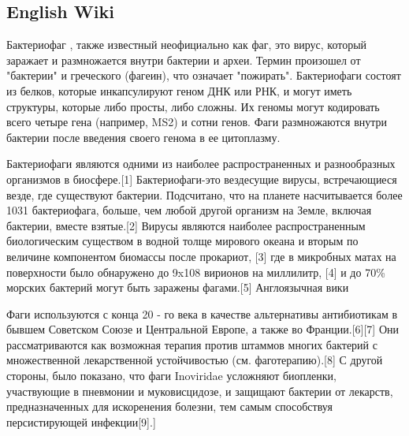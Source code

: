 \documentclass[a4paper,12pt]{article}
\begin{document}
    \begin{center}
    \item \subsection{English Wiki}
    \end{center}

	\par{Бактериофаг , также известный неофициально как фаг, это вирус, который
	заражает и размножается внутри бактерии и археи. Термин произошел от "бактерии" и греческого (фагеин), что
	означает "пожирать". Бактериофаги состоят из белков, которые инкапсулируют геном ДНК или РНК, и могут иметь
	структуры, которые либо просты, либо сложны. Их геномы могут кодировать всего четыре гена (например, MS2) и сотни
	генов. Фаги размножаются внутри бактерии после введения своего генома в ее цитоплазму.}
	
	\par{Бактериофаги являются одними из наиболее распространенных и разнообразных организмов в биосфере.[1]
	Бактериофаги-это вездесущие вирусы, встречающиеся везде, где существуют бактерии. Подсчитано, что на планете
	насчитывается более 1031 бактериофага, больше, чем любой другой организм на Земле, включая бактерии, вместе
	взятые.[2] Вирусы являются наиболее распространенным биологическим существом в водной толще мирового океана и вторым
	по величине компонентом биомассы после прокариот, [3] где в микробных матах на поверхности было обнаружено до 9x108
	вирионов на миллилитр, [4] и до 70\% морских бактерий могут быть заражены фагами.[5] Англоязычная вики}

    \par{Фаги используются с конца 20 - го века в качестве альтернативы антибиотикам в бывшем Советском Союзе и
    Центральной Европе, а также во Франции.[6][7] Они рассматриваются как возможная терапия против штаммов многих
    бактерий с множественной лекарственной устойчивостью (см. фаготерапию).[8] С другой стороны, было показано, что фаги
    Inoviridae усложняют биопленки, участвующие в пневмонии и муковисцидозе, и защищают бактерии от лекарств,
    предназначенных для искоренения болезни, тем самым способствуя персистирующей инфекции[9].]}
    
\end{document}
